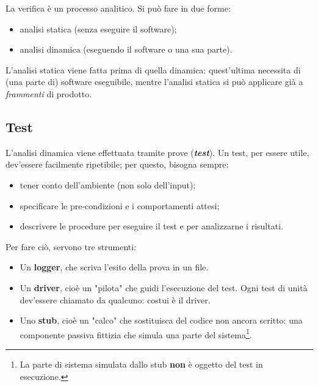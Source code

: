\documentclass[a4paper]{article}
\begin{document}
		
La verifica è un processo analitico. Si può fare in due forme:
		
	\begin{itemize}
		
			
	\item analisi statica (senza eseguire il software);
			
	\item analisi dinamica (eseguendo il software o una sua parte).
		
	\end{itemize}

		
L'analisi statica viene fatta prima di quella dinamica: quest'ultima necessita di (una parte di) software eseguibile, mentre l'analisi statica si può applicare già a \emph{frammenti} di prodotto.

		
	\subsection{Test}

		
L'analisi dinamica viene effettuata tramite prove (\emph{\textbf{test}}). Un test, per essere utile, dev'essere facilmente ripetibile; per questo, bisogna sempre:
		
	\begin{itemize}
		
			
	\item tener conto dell'ambiente (non solo dell'input);
			
	\item specificare le pre-condizioni e i comportamenti attesi;
			
	\item descrivere le procedure per eseguire il test e per analizzarne i risultati.
		
	\end{itemize}

		
Per fare ciò, servono tre strumenti:
		
	\begin{itemize}
		
			
	\item Un \textbf{logger}, che scriva l'esito della prova in un file.
			
	\item Un \textbf{driver}, cioè un "pilota" che guidi l'esecuzione del test. Ogni test di unità dev'essere chiamato da qualcuno: costui è il driver.
			
	\item Uno \textbf{stub}, cioè un "calco" che sostituisca del codice non ancora scritto: una componente passiva fittizia che simula una parte del sistema\footnote{La parte di sistema simulata dallo stub \textbf{non} è oggetto del test in esecuzione.}.
		
	\end{itemize}
\end{document}
